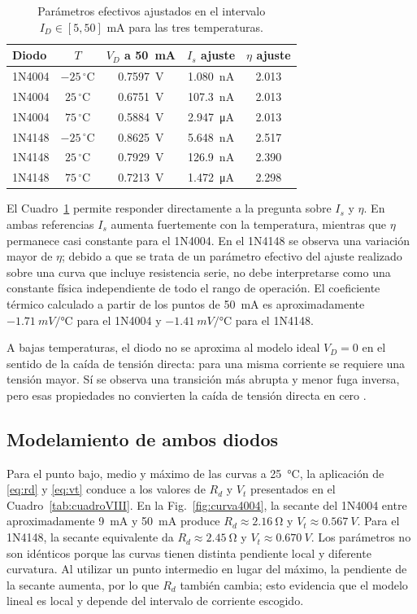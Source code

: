\documentclass[journal,a4paper]{IEEEtran}
\begin{document}
\begin{table}[H]
\centering
\caption{Parámetros efectivos ajustados en el intervalo $I_D\in[5,50]$ mA para las tres temperaturas.}
\label{tab:temperatura}
\scriptsize
\begin{tabular}{lcccc}
\toprule
Diodo & $T$ & $V_D$ a \SI{50}{mA} & $I_s$ ajuste & $\eta$ ajuste \\
\midrule
1N4004 & $-25\,^{\circ}$C & \SI{0.7597}{V} & \SI{1.080}{nA} & 2.013 \\
1N4004 & $25\,^{\circ}$C & \SI{0.6751}{V} & \SI{107.3}{nA} & 2.013 \\
1N4004 & $75\,^{\circ}$C & \SI{0.5884}{V} & \SI{2.947}{\micro A} & 2.013 \\
1N4148 & $-25\,^{\circ}$C & \SI{0.8625}{V} & \SI{5.648}{nA} & 2.517 \\
1N4148 & $25\,^{\circ}$C & \SI{0.7929}{V} & \SI{126.9}{nA} & 2.390 \\
1N4148 & $75\,^{\circ}$C & \SI{0.7213}{V} & \SI{1.472}{\micro A} & 2.298 \\
\bottomrule
\end{tabular}
\end{table}

El Cuadro~\ref{tab:temperatura} permite responder directamente a la pregunta sobre $I_s$ y $\eta$. En ambas referencias $I_s$ aumenta fuertemente con la temperatura, mientras que $\eta$ permanece casi constante para el 1N4004. En el 1N4148 se observa una variación mayor de $\eta$; debido a que se trata de un parámetro efectivo del ajuste realizado sobre una curva que incluye resistencia serie, no debe interpretarse como una constante física independiente de todo el rango de operación. El coeficiente térmico calculado a partir de los puntos de \SI{50}{mA} es aproximadamente $-\SI{1.71}{mV/\celsius}$ para el 1N4004 y $-\SI{1.41}{mV/\celsius}$ para el 1N4148.

A bajas temperaturas, el diodo no se aproxima al modelo ideal $V_D=0$ en el sentido de la caída de tensión directa: para una misma corriente se requiere una tensión mayor. Sí se observa una transición más abrupta y menor fuga inversa, pero esas propiedades no convierten la caída de tensión directa en cero \cite{sedra}.

\subsection{Modelamiento de ambos diodos}

Para el punto bajo, medio y máximo de las curvas a \SI{25}{\celsius}, la aplicación de \eqref{eq:rd} y \eqref{eq:vt} conduce a los valores de $R_d$ y $V_t$ presentados en el Cuadro~\ref{tab:cuadroVIII}. En la Fig.~\ref{fig:curva4004}, la secante del 1N4004 entre aproximadamente \SI{9}{mA} y \SI{50}{mA} produce $R_d\approx\SI{2.16}{\ohm}$ y $V_t\approx\SI{0.567}{V}$. Para el 1N4148, la secante equivalente da $R_d\approx\SI{2.45}{\ohm}$ y $V_t\approx\SI{0.670}{V}$. Los parámetros no son idénticos porque las curvas tienen distinta pendiente local y diferente curvatura. Al utilizar un punto intermedio en lugar del máximo, la pendiente de la secante aumenta, por lo que $R_d$ también cambia; esto evidencia que el modelo lineal es local y depende del intervalo de corriente escogido.
\end{document}
